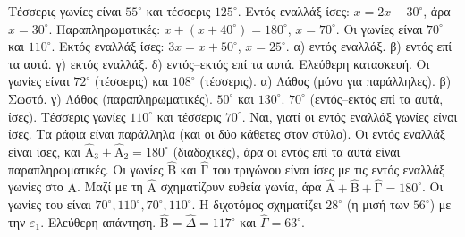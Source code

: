  Τέσσερις γωνίες είναι $55^\circ$ και τέσσερις $125^\circ$.
 Εντός εναλλάξ ίσες: $x=2x-30^\circ$, άρα $x=30^\circ$.
 Παραπληρωματικές: $x+(x+40^\circ)=180^\circ$, $x=70^\circ$. Οι γωνίες είναι $70^\circ$ και $110^\circ$.
 Εκτός εναλλάξ ίσες: $3x=x+50^\circ$, $x=25^\circ$.
 α) εντός εναλλάξ. β) εντός επί τα αυτά. γ) εκτός εναλλάξ. δ) εντός--εκτός επί τα αυτά.
 Ελεύθερη κατασκευή. Οι γωνίες είναι $72^\circ$ (τέσσερις) και $108^\circ$ (τέσσερις).
 α) Λάθος (μόνο για παράλληλες). β) Σωστό. γ) Λάθος (παραπληρωματικές).
 $50^\circ$ και $130^\circ$.
 $70^\circ$ (εντός--εκτός επί τα αυτά, ίσες).
 Τέσσερις γωνίες $110^\circ$ και τέσσερις $70^\circ$.
 Ναι, γιατί οι εντός εναλλάξ γωνίες είναι ίσες.
 Τα ράφια είναι παράλληλα (και οι δύο κάθετες στον στύλο).
 Οι εντός εναλλάξ είναι ίσες, και $\hat{\mathrm{Α}}_3+\hat{\mathrm{Α}}_2=180^\circ$ (διαδοχικές), άρα οι εντός επί τα αυτά είναι παραπληρωματικές.
 Οι γωνίες $\hat{\mathrm{Β}}$ και $\hat{\mathrm{Γ}}$ του τριγώνου είναι ίσες με τις εντός εναλλάξ γωνίες στο $\mathrm{Α}$. Μαζί με τη $\hat{\mathrm{Α}}$ σχηματίζουν ευθεία γωνία, άρα $\hat{\mathrm{Α}}+\hat{\mathrm{Β}}+\hat{\mathrm{Γ}}=180^\circ$.
 Οι γωνίες του είναι $70^\circ,110^\circ,70^\circ,110^\circ$.
 Η διχοτόμος σχηματίζει $28^\circ$ (η μισή των $56^\circ$) με την $\varepsilon_1$.
 Ελεύθερη απάντηση.
 $\hat{\mathrm{Β}}=\hat{\Delta}=117^\circ$ και $\hat{\Gamma}=63^\circ$.
